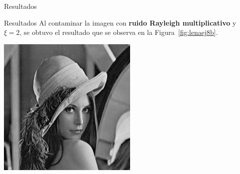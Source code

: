 \documentclass{beamer}
\begin{document}
\begin{frame}[fragile]{Resultados}
\begin{minipage}{0.45\linewidth}
		\label{fig:lenaej8a}
	\end{minipage}
\end{frame}

\begin{frame}[fragile]{Resultados}
	\justifying
	Al contaminar la imagen con \textcolor{unahurverde}{\textbf{ruido Rayleigh multiplicativo}} y $\xi=2$, 
	se obtuvo el resultado que se observa en la Figura~\ref{fig:lenaej8b}.
	
	\vspace{0.5cm}
	\centering
	\begin{minipage}{0.45\linewidth}
		\centering
		\includegraphics[width=\linewidth]{../results/lena_original}
		\label{fig:lenaoriginal8b}
	\end{minipage}\hfill
	\begin{minipage}{0.45\linewidth}
		\centering

\end{minipage}
\end{frame}
\end{document}
